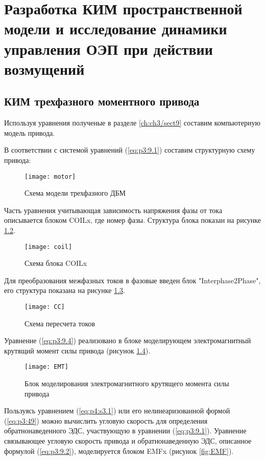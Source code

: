 \chapter{Разработка КИМ пространственной модели и исследование динамики управления ОЭП при действии возмущений} \label{ch:ch5}

\section{КИМ трехфазного моментного привода} \label{ch:ch5/sect1}

Используя уравнения полученые в разделе \ref{ch:ch3/sect9} составим компьютерную модель привода.

В соответствии с системой уравнений (\ref{eq:p3:9.1}) составим структурную схему привода:
\begin{figure}[ht]
	\centering
	\texttt{[image: motor]} 
	\caption{Схема модели трехфазного ДБМ}
	\label{fig:motor}
\end{figure}

Часть уравнения учитывающая зависимость напряжения фазы от тока описывается блоком COILx, где номер фазы. Структура блока показан на рисунке \ref{fig:motor_coil}.

\begin{figure}[ht]
	\centering
	\texttt{[image: coil]} 
	\caption{Схема блока COILx}
	\label{fig:motor_coil}
\end{figure}

Для преобразования межфазных токов в фазовые введен блок "Interphase2Phase", его структура показана на рисунке \ref{fig:CC}.

\begin{figure}[ht]
	\centering
	\texttt{[image: CC]} 
	\caption{Схема пересчета токов}
	\label{fig:CC}
\end{figure}

Уравнение (\ref{eq:p3:9.4}) реализовано в блоке моделирующем электромагнитный крутящий момент силы привода (рисунок \ref{fig:EMT}).

\begin{figure}[ht]
	\centering
	\texttt{[image: EMT]} 
	\caption{Блок моделирования электромагнитного крутящего момента силы привода}
	\label{fig:EMT}
\end{figure}

Пользуясь уравнением (\ref{eq:p4:s3.1}) или его нелинеаризованной формой (\ref{eq:p3:49}) можно вычислить угловую скорость для определения обратнонаведенного ЭДС, участвующую в уравнении (\ref{eq:p3:9.1}). Уравнение связывающее угловую скорость привода и обратнонаведенную ЭДС, описанное формулой (\ref {eq:p3:9.2}), моделируется блоком EMFx (рисунок \ref{fig:EMF}).

